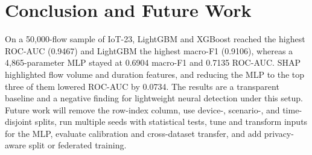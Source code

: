 \section{Conclusion and Future Work}
On a 50,000-flow sample of IoT-23, LightGBM and XGBoost reached the highest ROC-AUC (0.9467) and LightGBM the highest macro-F1 (0.9106), whereas a 4,865-parameter MLP stayed at 0.6904 macro-F1 and 0.7135 ROC-AUC. SHAP highlighted flow volume and duration features, and reducing the MLP to the top three of them lowered ROC-AUC by 0.0734. The results are a transparent baseline and a negative finding for lightweight neural detection under this setup. Future work will remove the row-index column, use device-, scenario-, and time-disjoint splits, run multiple seeds with statistical tests, tune and transform inputs for the MLP, evaluate calibration and cross-dataset transfer, and add privacy-aware split or federated training.